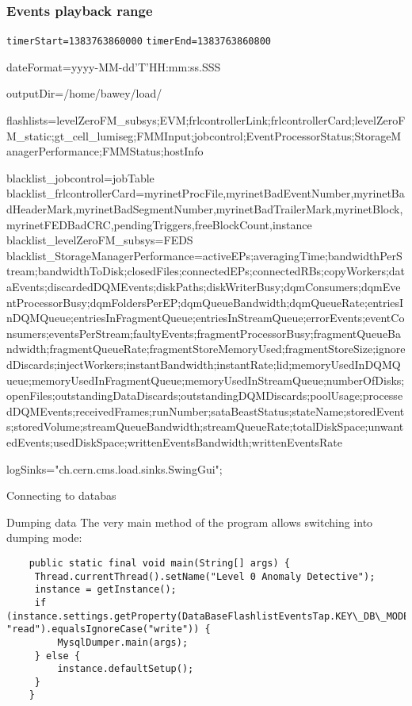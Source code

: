 \subsubsection{Events playback range}

\texttt{timerStart=1383763860000}
\texttt{timerEnd=1383763860800}

dateFormat=yyyy-MM-dd'T'HH:mm:ss.SSS

outputDir=/home/bawey/load/

flashlists=levelZeroFM\_subsys;EVM;frlcontrollerLink;frlcontrollerCard;levelZeroFM\_static;gt\_cell\_lumiseg;FMMInput;jobcontrol;EventProcessorStatus;StorageManagerPerformance;FMMStatus;hostInfo

blacklist\_jobcontrol=jobTable
blacklist\_frlcontrollerCard=myrinetProcFile,myrinetBadEventNumber,myrinetBadHeaderMark,myrinetBadSegmentNumber,myrinetBadTrailerMark,myrinetBlock,myrinetFEDBadCRC,pendingTriggers,freeBlockCount,instance
blacklist\_levelZeroFM\_subsys=FEDS
blacklist\_StorageManagerPerformance=activeEPs;averagingTime;bandwidthPerStream;bandwidthToDisk;closedFiles;connectedEPs;connectedRBs;copyWorkers;dataEvents;discardedDQMEvents;diskPaths;diskWriterBusy;dqmConsumers;dqmEventProcessorBusy;dqmFoldersPerEP;dqmQueueBandwidth;dqmQueueRate;entriesInDQMQueue;entriesInFragmentQueue;entriesInStreamQueue;errorEvents;eventConsumers;eventsPerStream;faultyEvents;fragmentProcessorBusy;fragmentQueueBandwidth;fragmentQueueRate;fragmentStoreMemoryUsed;fragmentStoreSize;ignoredDiscards;injectWorkers;instantBandwidth;instantRate;lid;memoryUsedInDQMQueue;memoryUsedInFragmentQueue;memoryUsedInStreamQueue;numberOfDisks;openFiles;outstandingDataDiscards;outstandingDQMDiscards;poolUsage;processedDQMEvents;receivedFrames;runNumber;sataBeastStatus;stateName;storedEvents;storedVolume;streamQueueBandwidth;streamQueueRate;totalDiskSpace;unwantedEvents;usedDiskSpace;writtenEventsBandwidth;writtenEventsRate

logSinks="ch.cern.cms.load.sinks.SwingGui";


Connecting to databas

Dumping data
The very main method of the program allows switching into dumping mode:

\begin{lstlisting}
	public static final void main(String[] args) {
   	 Thread.currentThread().setName("Level 0 Anomaly Detective");
   	 instance = getInstance();
   	 if (instance.settings.getProperty(DataBaseFlashlistEventsTap.KEY\_DB\_MODE, "read").equalsIgnoreCase("write")) {
   		 MysqlDumper.main(args);
   	 } else {
   		 instance.defaultSetup();
   	 }
    }
\end{lstlisting}

